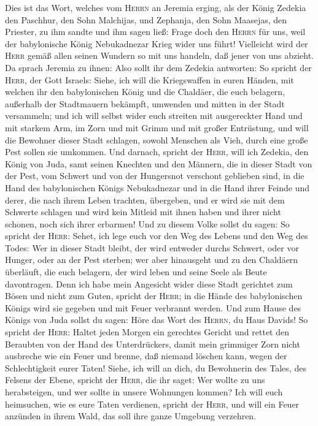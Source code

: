  Dies ist das Wort, welches vom \textsc{Herrn} an Jeremia
erging, als der König Zedekia den Paschhur, den Sohn Malchijas, und
Zephanja, den Sohn Maasejas, den Priester, zu ihm sandte und ihm sagen
ließ:  Frage doch den \textsc{Herrn} für uns, weil der
babylonische König Nebukadnezar Krieg wider uns führt! Vielleicht wird
der \textsc{Herr} gemäß allen seinen Wundern so mit uns handeln, daß
jener von uns abzieht. Da sprach Jeremia zu ihnen:  Also
sollt ihr dem Zedekia antworten:  So spricht der
\textsc{Herr}, der Gott Israels: Siehe, ich will die Kriegswaffen in
euren Händen, mit welchen ihr den babylonischen König und die Chaldäer,
die euch belagern, außerhalb der Stadtmauern bekämpft, umwenden und
mitten in der Stadt versammeln;  und ich will selbst wider
euch streiten mit ausgereckter Hand und mit starkem Arm, im Zorn und mit
Grimm und mit großer Entrüstung,  und will die Bewohner
dieser Stadt schlagen, sowohl Menschen als Vieh, durch eine große Pest
sollen sie umkommen.  Und darnach, spricht der
\textsc{Herr}, will ich Zedekia, den König von Juda, samt seinen
Knechten und den Männern, die in dieser Stadt von der Pest, vom Schwert
und von der Hungersnot verschont geblieben sind, in die Hand des
babylonischen Königs Nebukadnezar und in die Hand ihrer Feinde und
derer, die nach ihrem Leben trachten, übergeben, und er wird sie mit dem
Schwerte schlagen und wird kein Mitleid mit ihnen haben und ihrer nicht
schonen, noch sich ihrer erbarmen!  Und zu diesem Volke
sollst du sagen: So spricht der \textsc{Herr}: Sehet, ich lege euch vor
den Weg des Lebens und den Weg des Todes:  Wer in dieser
Stadt bleibt, der wird entweder durchs Schwert, oder vor Hunger, oder an
der Pest sterben; wer aber hinausgeht und zu den Chaldäern überläuft,
die euch belagern, der wird leben und seine Seele als Beute davontragen.
 Denn ich habe mein Angesicht wider diese Stadt gerichtet
zum Bösen und nicht zum Guten, spricht der \textsc{Herr}; in die Hände
des babylonischen Königs wird sie gegeben und mit Feuer verbrannt
werden.  Und zum Hause des Königs von Juda sollst du
sagen: Höre das Wort des \textsc{Herrn}, du Haus Davids! 
So spricht der \textsc{Herr}: Haltet jeden Morgen ein gerechtes Gericht
und rettet den Beraubten von der Hand des Unterdrückers, damit mein
grimmiger Zorn nicht ausbreche wie ein Feuer und brenne, daß niemand
löschen kann, wegen der Schlechtigkeit eurer Taten! 
Siehe, ich will an dich, du Bewohnerin des Tales, des Felsens der Ebene,
spricht der \textsc{Herr}, die ihr saget: Wer wollte zu uns
herabsteigen, und wer sollte in unsere Wohnungen kommen? 
Ich will euch heimsuchen, wie es eure Taten verdienen, spricht der
\textsc{Herr}, und will ein Feuer anzünden in ihrem Wald, das soll ihre
ganze Umgebung verzehren.

